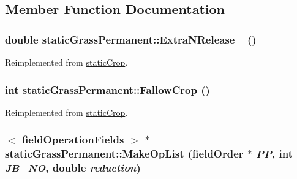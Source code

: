 \subsection{Member Function Documentation}
\hypertarget{classstatic_grass_permanent_a9f31a10c51ef98d46230e6a9a74816ba}{
\subsubsection[{ExtraNRelease\_\-}]{\setlength{\rightskip}{0pt plus 5cm}double staticGrassPermanent::ExtraNRelease\_\- ()}}
\label{classstatic_grass_permanent_a9f31a10c51ef98d46230e6a9a74816ba}


Reimplemented from \hyperlink{classstatic_crop_afe0cb8a7831afa941a37338f05227d67}{staticCrop}.\hypertarget{classstatic_grass_permanent_a0c8521795691964d29dbb11d78c45ef9}{
\subsubsection[{FallowCrop}]{\setlength{\rightskip}{0pt plus 5cm}int staticGrassPermanent::FallowCrop ()}}
\label{classstatic_grass_permanent_a0c8521795691964d29dbb11d78c45ef9}


Reimplemented from \hyperlink{classstatic_crop_ac8b14325e2ab05247e9b61e3af331f24}{staticCrop}.\hypertarget{classstatic_grass_permanent_a382ae95421ef703e3d710a792c1604c7}{
\subsubsection[{MakeOpList}]{$<$ {\bf fieldOperationFields} $>$ $\ast$ staticGrassPermanent::MakeOpList ({\bf fieldOrder} $\ast$ {\em PP}, \/  int {\em JB\_\-NO}, \/  double {\em reduction})}}
\label{classstatic_grass_permanent_a382ae95421ef703e3d710a792c1604c7}


